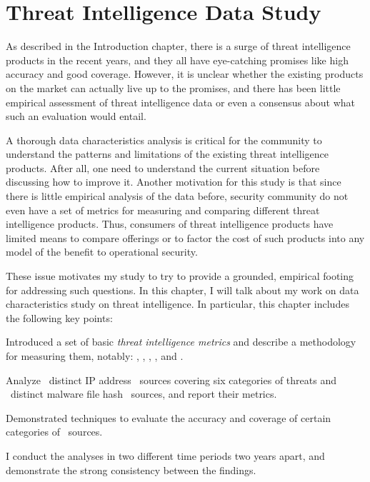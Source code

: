\chapter{Threat Intelligence Data Study}
\label{chapter:data_character}

As described in the Introduction 
chapter, there is a surge of threat intelligence products in the 
recent years, and they all have eye-catching promises like high 
accuracy and good coverage. However, it is unclear whether the
existing products on the market can actually live up to the 
promises, and there has been little empirical assessment of 
threat intelligence data or even a consensus about what such an
evaluation would entail. 

A thorough data characteristics analysis is critical for the 
community to understand the patterns and limitations of the
existing threat intelligence products. After all, one need to 
understand the current situation before discussing how to 
improve it. Another motivation for this 
study is that since there is little empirical analysis of the 
data before, security community do not even have a set of metrics for
measuring and comparing different threat intelligence products. 
Thus, consumers of threat intelligence products have limited means 
to compare offerings or to factor the cost of such products into 
any model of the benefit to operational security.

These issue motivates my study to try to provide a grounded,
empirical footing for addressing such questions. 
In this chapter, I will talk about my work on data characteristics
study on threat intelligence. In particular, this chapter includes 
the following key points:
\begin{prettylist}
\item Introduced a set of basic \emph{threat intelligence metrics}
and describe a methodology for measuring them, notably: 
,
, ,
,  and .
\item Analyze \numipfeeds\ distinct IP address \ti\ sources covering
six categories of threats and \numhashfeeds\ distinct malware file hash
\ti\ sources, and report their metrics.
\item Demonstrated techniques to evaluate the accuracy and coverage of
certain categories of \ti\ sources.
\item I conduct the analyses in two different time periods two 
years apart, and demonstrate the strong consistency between the 
findings.
\end{prettylist}

